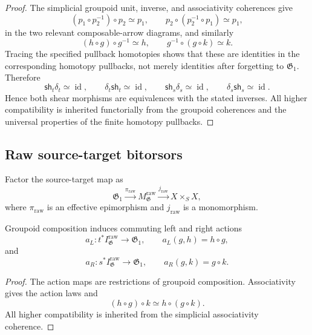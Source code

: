 \begin{proof}
The simplicial groupoid unit, inverse, and associativity coherences give
\[
    (p_1\circ p_2^{-1})\circ p_2\simeq p_1,
    \qquad
    p_2\circ(p_2^{-1}\circ p_1)\simeq p_1,
\]
in the two relevant composable-arrow diagrams, and similarly
\[
    (h\circ g)\circ g^{-1}\simeq h,
    \qquad
    g^{-1}\circ(g\circ k)\simeq k.
\]
Tracing the specified pullback homotopies shows that these are identities in
the corresponding homotopy pullbacks, not merely identities after forgetting
to $\mathfrak G_1$.  Therefore
\[
    \mathsf{sh}_t\delta_t\simeq\operatorname{id},
    \qquad
    \delta_t\mathsf{sh}_t\simeq\operatorname{id},
    \qquad
    \mathsf{sh}_s\delta_s\simeq\operatorname{id},
    \qquad
    \delta_s\mathsf{sh}_s\simeq\operatorname{id}.
\]
Hence both shear morphisms are equivalences with the stated inverses.  All
higher compatibility is inherited functorially from the groupoid coherences
and the universal properties of the finite homotopy pullbacks.
\end{proof}

\subsection{Raw source-target bitorsors}

Factor the source-target map as
\[
    \mathfrak G_1
    \xrightarrow{\pi_{\mathrm{raw}}}
    M^{\mathrm{raw}}_{\mathfrak G}
    \xrightarrow{j_{\mathrm{raw}}}
    X\times_SX,
\]
where $\pi_{\mathrm{raw}}$ is an effective epimorphism and
$j_{\mathrm{raw}}$ is a monomorphism.

\begin{proposition}
\label{prop:isotropy-actions}
Groupoid composition induces commuting left and right actions
\[
    a_L:
    t^*I^{\mathrm{raw}}_{\mathfrak G}
    \longrightarrow
    \mathfrak G_1,
    \qquad
    a_L(g,h)=h\circ g,
\]
and
\[
    a_R:
    s^*I^{\mathrm{raw}}_{\mathfrak G}
    \longrightarrow
    \mathfrak G_1,
    \qquad
    a_R(g,k)=g\circ k.
\]
\end{proposition}

\begin{proof}
The action maps are restrictions of groupoid composition.  Associativity gives
the action laws and
\[
    (h\circ g)\circ k
    \simeq
    h\circ(g\circ k).
\]
All higher compatibility is inherited from the simplicial associativity
coherence.
\end{proof}

